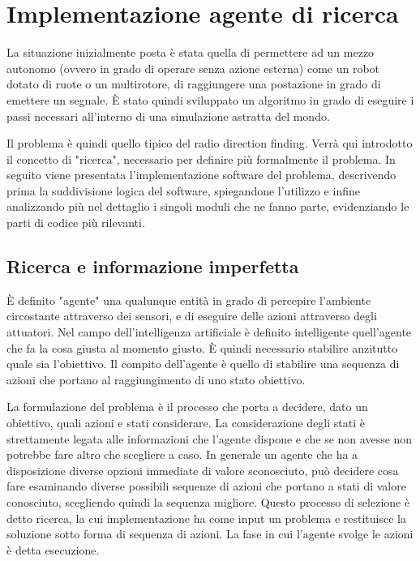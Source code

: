 \chapter{Implementazione agente di ricerca}
La situazione inizialmente posta è stata quella di permettere ad un mezzo autonomo (ovvero in grado di operare senza azione esterna) come un robot dotato di ruote o un multirotore, di raggiungere una postazione in grado di emettere un segnale. È stato quindi sviluppato un algoritmo in grado di eseguire i passi necessari all'interno di una simulazione astratta del mondo. 

Il problema è quindi quello tipico del radio direction finding. Verrà qui introdotto il concetto di "ricerca", necessario per definire più formalmente il problema. In seguito viene presentata l'implementazione software del problema, descrivendo prima la suddivisione logica del software, spiegandone l'utilizzo e infine analizzando più nel dettaglio i singoli moduli che ne fanno parte, evidenziando le parti di codice più rilevanti.

\section{Ricerca e informazione imperfetta}
È definito "agente" una qualunque entità in grado di percepire l'ambiente circostante attraverso dei sensori, e di eseguire delle azioni attraverso degli attuatori. Nel campo dell'intelligenza artificiale è definito intelligente quell'agente che fa la cosa giusta al momento giusto. È quindi necessario stabilire anzitutto quale sia l'obiettivo. Il compito dell'agente è quello di stabilire una sequenza di azioni che portano al raggiungimento di uno stato obiettivo. 

La formulazione del problema è il processo che porta a decidere, dato un obiettivo, quali azioni e stati considerare. La considerazione degli stati è strettamente legata alle informazioni che l'agente dispone e che se non avesse non potrebbe fare altro che scegliere a caso. In generale un agente che ha a disposizione diverse opzioni immediate di valore sconosciuto, può decidere cosa fare esaminando diverse possibili sequenze di azioni che portano a stati di valore conosciuto, scegliendo quindi la sequenza migliore. Questo processo di selezione è detto ricerca, la cui implementazione ha come input un problema e restituisce la soluzione sotto forma di sequenza di azioni. La fase in cui l'agente svolge le azioni è detta esecuzione.

